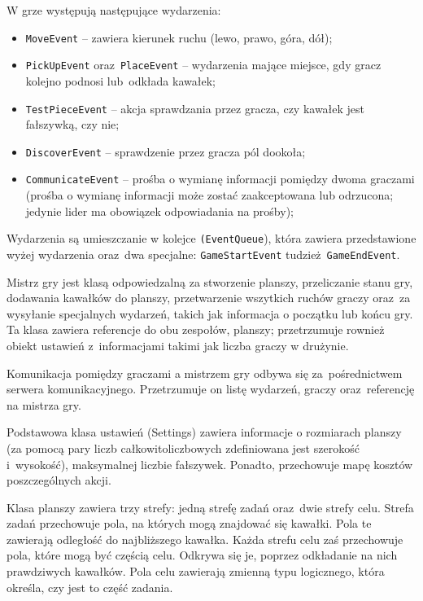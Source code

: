 \documentclass[a4paper]{article}
\newcommand{\code}{\texttt}
\begin{document}
\hfill 

W grze występują następujące wydarzenia:
\begin{itemize}
    \item \code{MoveEvent} -- zawiera kierunek ruchu (lewo, prawo, góra, dół);
    \item \code{PickUpEvent} oraz~\code{PlaceEvent} -- wydarzenia mające miejsce, gdy gracz kolejno podnosi lub~odkłada kawałek;
    \item \code{TestPieceEvent} -- akcja sprawdzania przez gracza, czy kawałek jest fałszywką, czy nie;
    \item \code{DiscoverEvent} -- sprawdzenie przez gracza pól dookoła;
    \item \code{CommunicateEvent} -- prośba o wymianę informacji pomiędzy dwoma graczami (prośba o wymianę informacji może zostać zaakceptowana lub odrzucona; jedynie lider ma obowiązek odpowiadania na prośby);
\end{itemize}

Wydarzenia są umieszczanie w kolejce \code{(EventQueue}), która zawiera przedstawione wyżej wydarzenia oraz~dwa specjalne: \code{GameStartEvent} tudzież~\code{GameEndEvent}.

\hfill

Mistrz gry jest klasą odpowiedzalną za stworzenie planszy, przeliczanie stanu gry, dodawania kawałków do planszy, przetwarzenie wszytkich ruchów graczy oraz~za wysyłanie specjalnych wydarzeń, takich jak informacja o początku lub końcu gry.
Ta klasa zawiera referencje do obu zespołów, planszy; przetrzumuje rownież obiekt ustawień z~informacjami takimi jak liczba graczy w drużynie.

Komunikacja pomiędzy graczami a mistrzem gry odbywa się za~pośrednictwem serwera komunikacyjnego.
Przetrzumuje on listę wydarzeń, graczy oraz~referencję na mistrza gry.

Podstawowa klasa ustawień (Settings) zawiera informacje o rozmiarach planszy (za pomocą pary liczb całkowitoliczbowych zdefiniowana jest szerokość i~wysokość), maksymalnej liczbie fałszywek.
Ponadto, przechowuje mapę kosztów poszczególnych akcji.

Klasa planszy zawiera trzy strefy: jedną strefę zadań oraz~dwie strefy celu.
Strefa zadań przechowuje pola, na których mogą znajdować się kawałki.
Pola te zawierają odległość do najbliższego kawałka.
Każda strefu celu zaś przechowuje pola, które mogą być częścią celu.
Odkrywa się je, poprzez odkładanie na nich prawdziwych kawałków.
Pola celu zawierają zmienną typu logicznego, która określa, czy jest to część zadania.
\end{document}
